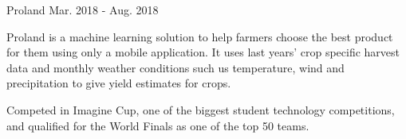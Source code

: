 \begin{cventries}
  \project
    {Proland} %
    {Mar. 2018 - Aug. 2018} %
    {
      \begin{cvitems}
        \item {Proland is a machine learning solution to help farmers choose the best product for them using only a mobile application. It uses last years' crop specific harvest data and monthly weather conditions such us temperature, wind and precipitation to give yield estimates for crops.}
        \item {Competed in Imagine Cup, one of the biggest student technology competitions, and qualified for the World Finals as one of the top 50 teams.}
      \end{cvitems}
    }
\end{cventries}
